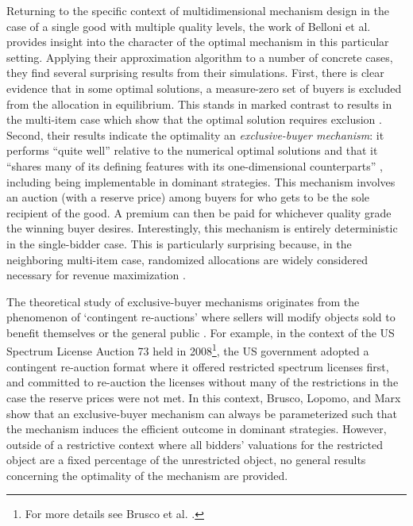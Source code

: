 Returning to the specific context of multidimensional mechanism design in the case of a single good with multiple quality levels, the work of Belloni et al. \autocite*{belloni2010multidimensional} provides insight into the character of the optimal mechanism in this particular setting. Applying their approximation algorithm to a number of concrete cases, they find several surprising results from their simulations. First, there is clear evidence that in some optimal solutions, a measure-zero set of buyers is excluded from the allocation in equilibrium. This stands in marked contrast to results in the multi-item case which show that the optimal solution requires exclusion \autocite{rochet1998ironing, armstrong1996multiproduct}. Second, their results indicate the optimality an \textit{exclusive-buyer mechanism}: it performs ``quite well'' relative to the numerical optimal solutions and that it ``shares many of its defining features with its one-dimensional counterparts'' \autocite[p1085-6]{belloni2010multidimensional}, including being implementable in dominant strategies. This mechanism involves an auction (with a reserve price) among buyers for who gets to be the sole recipient of the good. A premium can then be paid for whichever quality grade the winning buyer desires. Interestingly, this mechanism is entirely deterministic in the single-bidder case.  This is particularly surprising because, in the neighboring multi-item case, randomized allocations are widely considered necessary for revenue maximization \autocite{daskalakis2015multi}.

The theoretical study of exclusive-buyer mechanisms originates from the phenomenon of `contingent re-auctions' where sellers will modify objects sold to benefit themselves or the general public \autocite{brusco2011}. For example, in the context of the US Spectrum License Auction 73 held in 2008\footnote{For more details see Brusco et al. \autocite*{brusco2009google}.}, the US government adopted a contingent re-auction format where it offered restricted spectrum licenses first, and committed to re-auction the licenses without many of the restrictions in the case the reserve prices were not met. In this context, Brusco, Lopomo, and Marx \autocite*{brusco2011} show that an exclusive-buyer mechanism can always be parameterized such that the mechanism induces the efficient outcome in dominant strategies. However, outside of a restrictive context where all bidders' valuations for the restricted object are a fixed percentage of the unrestricted object, no general results concerning the optimality of the mechanism are provided.

